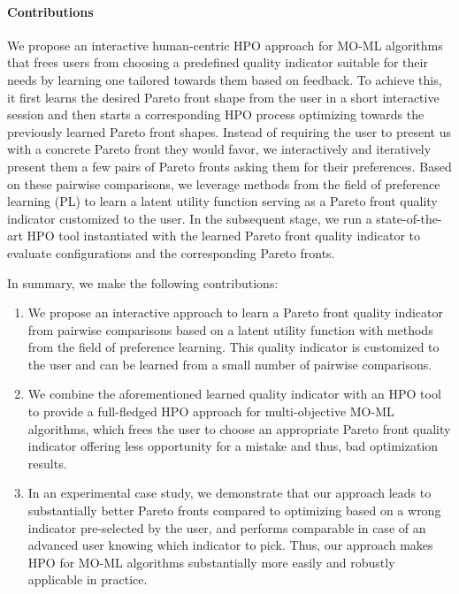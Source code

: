 \paragraph{Contributions} We propose an interactive human-centric HPO \cite{pfisterer-arxiv2019a,souza-ecmlpkdd21a,moosbauer-neurips21a,hvarfner-iclr22a,moosbauer-arxiv22a,francia-fgcs23a,segel-automl23a,mallik-arxiv23} approach for MO-ML algorithms that frees users from choosing a predefined quality indicator suitable for their needs by learning one tailored towards them based on feedback.
To achieve this, it first learns the desired Pareto front shape from the user in a short interactive session and then starts a corresponding HPO process optimizing towards the previously learned Pareto front shapes.
Instead of requiring the user to present us with a concrete Pareto front they would favor, we interactively and iteratively present them a few pairs of Pareto fronts asking them for their preferences.
Based on these pairwise comparisons, we leverage methods from the field of preference learning (PL) \cite{furnkranz-plbook10a} to learn a latent utility function serving as a Pareto front quality indicator customized to the user.
In the subsequent stage, we run a state-of-the-art HPO tool
instantiated with the learned Pareto front quality indicator to evaluate configurations and the corresponding Pareto fronts.

In summary, we make the following contributions:
\begin{enumerate}
    \item We propose an interactive approach to learn a Pareto front quality indicator from pairwise comparisons based on a latent utility function with methods from the field of preference learning. This quality indicator is customized to the user and can be learned from a small number of pairwise comparisons. 
    \item We combine the aforementioned learned quality indicator with an HPO tool 
    to provide a full-fledged HPO approach for multi-objective MO-ML algorithms, which frees the user to choose an appropriate Pareto front quality indicator offering less opportunity for a mistake and thus, bad optimization results.
    \item In an experimental case study, we demonstrate that our approach leads to substantially better Pareto fronts compared to optimizing based on a wrong indicator pre-selected by the user, and performs comparable in case of an advanced user knowing which indicator to pick. Thus, our approach makes HPO for MO-ML algorithms substantially more easily and robustly applicable in practice.
\end{enumerate}

